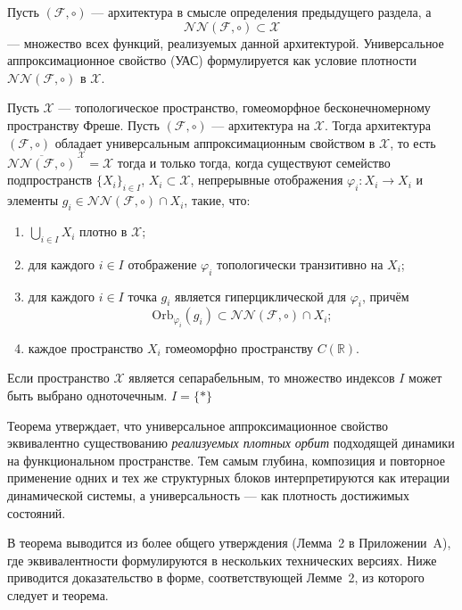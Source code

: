 \documentclass[../NDCNNAI_main.tex]{subfiles}
\begin{document}
Пусть $(\mathcal{F},\circ)$ --- архитектура в смысле определения предыдущего
раздела, а
\[
\mathcal{NN}(\mathcal{F},\circ) \subset \mathcal{X}
\]
--- множество всех функций, реализуемых данной архитектурой.
Универсальное аппроксимационное свойство (УАС) формулируется как условие плотности
$\mathcal{NN}(\mathcal{F},\circ)$ в $\mathcal{X}$.

\begin{theorem}
\label{thm:kratsios_characterization}
Пусть $\mathcal{X}$ --- топологическое пространство, гомеоморфное
бесконечномерному пространству Фреше.
Пусть $(\mathcal{F},\circ)$ --- архитектура на $\mathcal{X}$.
Тогда архитектура $(\mathcal{F},\circ)$ обладает универсальным аппроксимационным
свойством в $\mathcal{X}$, то есть $\overline{\mathcal{NN}(\mathcal{F},\circ)}^{\,\mathcal{X}} = \mathcal{X}$
тогда и только тогда, когда существуют семейство подпространств $\{X_i\}_{i\in I}$, $X_i \subset \mathcal{X}$,
непрерывные отображения $\varphi_i\colon X_i \to X_i$ и элементы $g_i \in \mathcal{NN}(\mathcal{F},\circ) \cap X_i$, такие, что:
\begin{enumerate}[label=(\alph*)]
  \item $\bigcup_{i\in I} X_i$ плотно в $\mathcal{X}$;
  \item для каждого $i\in I$ отображение $\varphi_i$ топологически
  транзитивно на $X_i$;
  \item для каждого $i\in I$ точка $g_i$ является гиперциклической для
  $\varphi_i$, причём
  \[
  \mathrm{Orb}_{\varphi_i}(g_i)
  \subset
  \mathcal{NN}(\mathcal{F},\circ) \cap X_i;
  \]
  \item[(d)] каждое пространство $X_i$ гомеоморфно пространству $C(\mathbb{R})$.
\end{enumerate}
Если пространство $\mathcal{X}$ является сепарабельным, то множество индексов
$I$ может быть выбрано одноточечным. $I = \{*\}$
\end{theorem}

\begin{remark}
Теорема утверждает, что универсальное аппроксимационное свойство эквивалентно
существованию \emph{реализуемых плотных орбит} подходящей динамики на
функциональном пространстве. Тем самым глубина, композиция и повторное применение
одних и тех же структурных блоков интерпретируются как итерации динамической
системы, а универсальность --- как плотность достижимых состояний.
\end{remark}

\begin{remark}
  В \cite{Kratsios2021} теорема выводится из более общего
  утверждения (Лемма~2 в Приложении~A), где эквивалентности формулируются в нескольких
  технических версиях. Ниже приводится доказательство в форме, соответствующей
  Лемме~2, из которого следует и теорема.
\end{remark}
\end{document}
